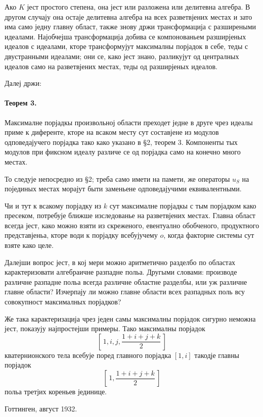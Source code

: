 ﻿\documentclass[11pt]{article}
\begin{document}
Ако \(K\) јест простого степена, она јест или разложена или делитевна алгебра. В другом случају она остаје делитевна алгебра на всех разветвјених местах и зато има само једну главну област, также знову држи трансформација с разширеными идеалами. Најобчејша трансформација добива се компонованьем разширјеных идеалов с идеалами, кторе трансформујут максималны порјадок в себе, теды с двустранными идеалами; они се, како јест знано, разликујут од централных идеалов само на разветвјених местах, теды од разширјеных идеалов.

Далеј држи:

\paragraph{Теорем 3.}
Максималне порјадкы произвольној области преходет једне в друге чрез идеалы приме к диференте, кторе на всаком месту сут составјене из модулов одповедајучего порјадка тако како указано в §2, теорем 3. Компоненты тых модулов при фиксном идеалу различе се од порјадка само на конечно много местах.

То следује непосредно из §2; треба само имети на памети, же операторы \(u_S\) на појединых местах морајут быти заменьене одповедајучими еквивалентными.

Чи и тут к всакому порјадку из \(k\) сут максималне порјадкы с тым порјадком како пресеком, потребује ближше изследованье на разветвјених местах. Главна област всегда јест, како можно взяти из скреженого, евентуално обобченого, продуктного представјеньа, кторе води к порјадку всебујучему \(o\), когда факторне системы сут взяте како целе.

Далејши вопрос јест, в кој мери можно аритметично разделбо по областах карактеризовати алгебраичне разпадне польа. Другыми словами: производе различне разпадне польа всегда различне областне разделбы, или уж различне главне области? Изчерпају ли можно главне области всех разпадных поль всу совокупност максималных порјадков?

Же така карактеризација чрез једен самы максималны порјадок сигурно неможна јест, показују најпростејши примеры. Тако максималны порјадок
\[
        \left[\,1,i,j,\frac{1+i+j+k}{2}\,\right]
\]
кватернионского тела всебује поред главного порјадка \([1,i]\) такодје главны порјадок
\[
        \left[\,1,\frac{1+i+j+k}{2}\,\right]
\]
польа третјих кореньев јединице.

\begin{center}
Готтинген, август 1932.
\end{center}
\clearpage
\end{document}
